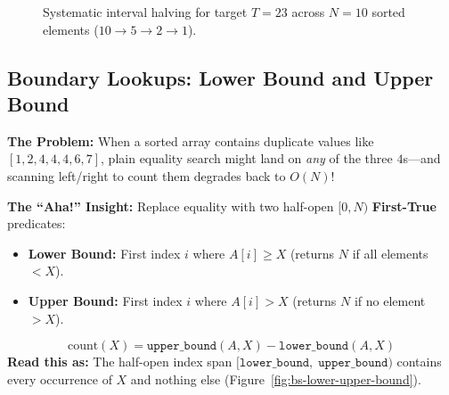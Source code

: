 \documentclass[11pt,a4paper]{article}
\theoremstyle{definition}
\newcommand{\painbeat}{\textbf{\color{accentamber}The Problem:} }
\newcommand{\ahabeat}{\textbf{\color{accentteal}The ``Aha!'' Insight:} }
\begin{document}
\begin{figure}[htbp]
\caption{Systematic interval halving for target $T = 23$ across $N = 10$ sorted elements ($10 \to 5 \to 2 \to 1$).}
\label{fig:bs-interval-halving}
\end{figure}

\subsection{Boundary Lookups: Lower Bound and Upper Bound}

\painbeat When a sorted array contains duplicate values like $[1, 2, 4, 4, 4, 6, 7]$, plain equality search might land on \emph{any} of the three $4$s---and scanning left/right to count them degrades back to $O(N)$!

\ahabeat Replace equality with two half-open $[0, N)$ \textbf{First-True} predicates:
\begin{itemize}
    \item \textbf{Lower Bound:} First index $i$ where $A[i] \ge X$ (returns $N$ if all elements $< X$).
    \item \textbf{Upper Bound:} First index $i$ where $A[i] > X$ (returns $N$ if no element $> X$).
\end{itemize}

\begin{formulabox}
$$\text{count}(X) = \texttt{upper\_bound}(A, X) - \texttt{lower\_bound}(A, X)$$
\textbf{Read this as:} The half-open index span $[\texttt{lower\_bound},\; \texttt{upper\_bound})$ contains every occurrence of $X$ and nothing else (Figure~\ref{fig:bs-lower-upper-bound}).
\end{formulabox}
\end{document}
